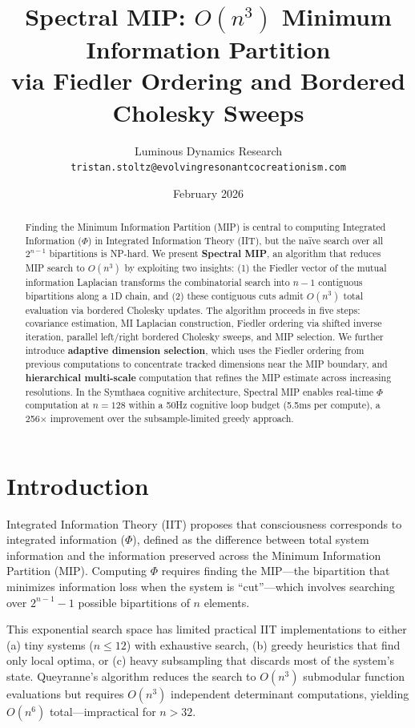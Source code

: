 \documentclass[10pt,letterpaper]{article}
\title{Spectral MIP: $O(n^3)$ Minimum Information Partition\\
via Fiedler Ordering and Bordered Cholesky Sweeps}
\author{
  Luminous Dynamics Research \\
  \texttt{tristan.stoltz@evolvingresonantcocreationism.com}
}
\date{February 2026}
\begin{document}
\maketitle

\begin{abstract}
Finding the Minimum Information Partition (MIP) is central to computing Integrated Information ($\Phi$) in Integrated Information Theory (IIT), but the na\"ive search over all $2^{n-1}$ bipartitions is NP-hard. We present \textbf{Spectral MIP}, an algorithm that reduces MIP search to $O(n^3)$ by exploiting two insights: (1) the Fiedler vector of the mutual information Laplacian transforms the combinatorial search into $n-1$ contiguous bipartitions along a 1D chain, and (2) these contiguous cuts admit $O(n^3)$ total evaluation via bordered Cholesky updates. The algorithm proceeds in five steps: covariance estimation, MI Laplacian construction, Fiedler ordering via shifted inverse iteration, parallel left/right bordered Cholesky sweeps, and MIP selection. We further introduce \textbf{adaptive dimension selection}, which uses the Fiedler ordering from previous computations to concentrate tracked dimensions near the MIP boundary, and \textbf{hierarchical multi-scale} computation that refines the MIP estimate across increasing resolutions. In the Symthaea cognitive architecture, Spectral MIP enables real-time $\Phi$ computation at $n=128$ within a 50Hz cognitive loop budget (5.5ms per compute), a 256$\times$ improvement over the subsample-limited greedy approach.
\end{abstract}

\section{Introduction}

Integrated Information Theory (IIT) \citep{tononi2004,oizumi2014} proposes that consciousness corresponds to integrated information ($\Phi$), defined as the difference between total system information and the information preserved across the Minimum Information Partition (MIP). Computing $\Phi$ requires finding the MIP---the bipartition that minimizes information loss when the system is ``cut''---which involves searching over $2^{n-1} - 1$ possible bipartitions of $n$ elements.

This exponential search space has limited practical IIT implementations to either (a) tiny systems ($n \leq 12$) with exhaustive search, (b) greedy heuristics that find only local optima, or (c) heavy subsampling that discards most of the system's state. Queyranne's algorithm \citep{queyranne1998} reduces the search to $O(n^3)$ submodular function evaluations but requires $O(n^3)$ independent determinant computations, yielding $O(n^6)$ total---impractical for $n > 32$.
\end{document}
